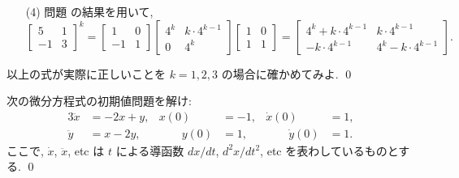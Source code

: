 \documentclass[12pt,twoside]{jarticle}
\begin{document}
{\begin{enumerate}
\begin{equation*}
    = \begin{bmatrix} -1 & 1 \\ 1 & 0 \end{bmatrix}
      \begin{bmatrix} 2^k & k\cdot 2^{k-1} \\ 0 & 2^k \end{bmatrix}
      \begin{bmatrix} 0 & 1 \\ 1 & 1 \end{bmatrix}
    = \begin{bmatrix}
        2^k - k\cdot 2^{k-1} & -k\cdot 2^{k-1} \\
        k\cdot 2^{k-1}       & 2^k + k\cdot 2^{k-1}
      \end{bmatrix}.
  \end{equation*}
\item[(4)] 問題  の結果を用いて,
  \begin{equation*}
      \begin{bmatrix} 5 & 1 \\ -1 & 3 \end{bmatrix}^k
    = \begin{bmatrix} 1 & 0 \\ -1 & 1 \end{bmatrix}
      \begin{bmatrix} 4^k & k\cdot 4^{k-1} \\ 0 & 4^k \end{bmatrix}
      \begin{bmatrix} 1 & 0 \\ 1 & 1 \end{bmatrix}
    = \begin{bmatrix}
        4^k + k\cdot 4^{k-1} & k\cdot 4^{k-1} \\
        - k\cdot 4^{k-1}     & 4^k - k\cdot 4^{k-1}
      \end{bmatrix}.
  \end{equation*}
\end{enumerate}
以上の式が実際に正しいことを $k=1,2,3$ の場合に確かめてみよ.
\qed
}


\begin{question}[20点]
\label{q:shokichimondaiwotoke}
  次の微分方程式の初期値問題を解け:
  \begin{alignat*}{3}
    \ddot x & = - 2 x +   y, &
    x(0) & = - 1, &
    \dot x(0) & = 1, 
    \\
    \ddot y & =     x - 2 y, &
    \qquad y(0) & = 1, &
    \qquad \dot y(0) & = 1.
  \end{alignat*}
  ここで, $\dot x$, $\ddot x$, etc は $t$ による導函数 $dx/dt$,
  $d^2x/dt^2$, etc を表わしているものとする.  \qed
\end{question}
\end{document}
